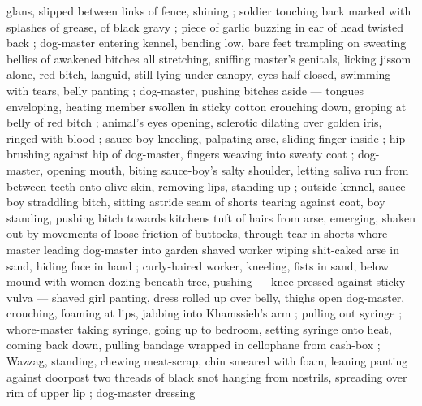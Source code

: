 glans, slipped between links of fence, shining ; soldier touching back marked with splashes of grease, of black gravy ; piece of garlic buzzing in ear of head twisted back  ; dog-master entering kennel, bending low, bare feet trampling on sweating bellies of awakened bitches {\col} all stretching, sniffing master's genitals, licking jissom {\col} alone, red bitch, languid, still lying under canopy, eyes half-closed, swimming with tears, belly panting ; dog-master, pushing bitches aside --- tongues enveloping, heating member swollen in sticky cotton {\dashcom} crouching down, groping at belly of red bitch ; animal's eyes opening, sclerotic dilating over golden iris, ringed with blood ; sauce-boy kneeling, palpating arse, sliding finger inside ; hip brushing against hip of dog-master, fingers weaving into sweaty coat ; dog-master, opening mouth, biting sauce-boy's salty shoulder, letting saliva run from between teeth onto olive skin, removing lips, standing up ; outside kennel, sauce-boy straddling bitch, sitting astride {\col} seam of shorts tearing against coat, boy standing, pushing bitch towards kitchens {\col} tuft of hairs from arse, emerging, shaken out by movements of loose friction of buttocks, through tear in shorts {\semislash} whore-master leading dog-master into garden {\col} shaved worker wiping shit-caked arse in sand, hiding face in hand ; curly-haired worker, kneeling, fists in sand, below mound with women dozing beneath tree, pushing --- knee pressed against sticky vulva --- shaved girl panting, dress rolled up over belly, thighs open {\semislash} dog-master, crouching, foaming at lips, jabbing into Khamssieh's arm ; pulling out syringe ; whore-master taking syringe, going up to bedroom, setting syringe onto heat, coming back down, pulling bandage wrapped in cellophane from cash-box ; Wazzag, standing, chewing meat-scrap, chin smeared with foam, leaning panting against doorpost {\col} two threads of black snot hanging from nostrils, spreading over rim of upper lip ; dog-master dressing 